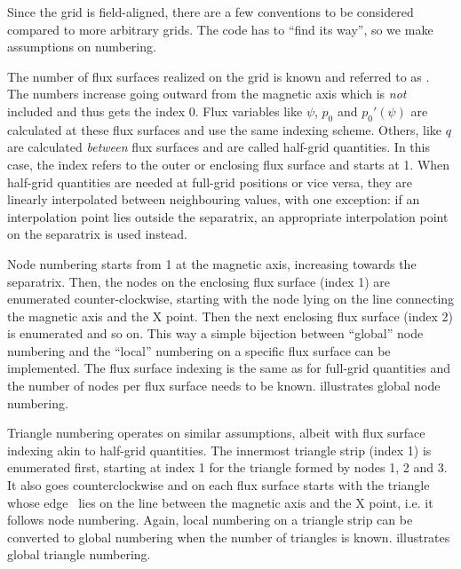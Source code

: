 Since the grid is field-aligned, there are a few conventions to be considered compared to more arbitrary grids. The code has to \enquote{find its way}, so we make assumptions on numbering.

The number of flux surfaces realized on the grid is known and referred to as \nflux. The numbers increase going outward from the magnetic axis which is \emph{not} included and thus gets the index 0. Flux variables like $\psi$, $p_{0}$ and $p_{0}' (\psi)$ are calculated at these flux surfaces and use the same indexing scheme. Others, like $q$ are calculated \emph{between} flux surfaces and are called half-grid quantities. In this case, the index refers to the outer or enclosing flux surface and starts at 1. When half-grid quantities are needed at full-grid positions or vice versa, they are linearly interpolated between neighbouring values, with one exception: if an interpolation point lies outside the separatrix, an appropriate interpolation point on the separatrix is used instead.

Node numbering starts from 1 at the magnetic axis, increasing towards the separatrix. Then, the nodes on the enclosing flux surface (index 1) are enumerated counter-clockwise, starting with the node lying on the line connecting the magnetic axis and the X point. Then the next enclosing flux surface (index 2) is enumerated and so on. This way a simple bijection between \enquote{global} node numbering and the \enquote{local} numbering on a specific flux surface can be implemented. The flux surface indexing is the same as for full-grid quantities and the number of nodes per flux surface needs to be known.  illustrates global node numbering.

Triangle numbering operates on similar assumptions, albeit with flux surface indexing akin to half-grid quantities. The innermost triangle strip (index 1) is enumerated first, starting at index 1 for the triangle formed by nodes 1, 2 and 3. It also goes counterclockwise and on each flux surface starts with the triangle whose edge \inw\ lies on the line between the magnetic axis and the X point, i.e. it follows node numbering. Again, local numbering on a triangle strip can be converted to global numbering when the number of triangles is known.  illustrates global triangle numbering.

